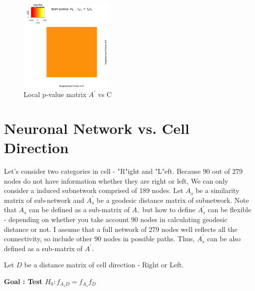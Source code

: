 \documentclass[12pt]{report}
\begin{document}
\begin{figure}[H]
\captionsetup{format=plain}
\centering
\includegraphics[width=0.4\textwidth]{../figure/P_A2_C.png}
\caption{Local p-value matrix $A^\prime$ vs C}
\label{fig:PA2C}
\end{figure} 





\newpage
\section{Neuronal Network vs. Cell Direction}

Let's consider two categories in cell - "R"ight and "L"eft. Because 90 out of 279 nodes do not have information whether they are right or left, We can only consider a induced subnetwork comprised of 189 nodes. Let $A_{s}$ be a similarity matrix of sub-network and $A^\prime_{s}$ be a geodesic distance matrix of subnetwork. Note that $A_{s}$ can be defined as a sub-matrix of $A,$ but how to define $A^\prime_{s}$ can be flexible - depending on whether you take account 90 nodes in calculating geodesic distance or not. I assume that a full network of 279 nodes well reflects all the connectivity, so include other 90 nodes in possible paths. Thus, $A^\prime_{s}$ can be also defined as a sub-matrix of $A^\prime.$
  
Let $D$ be a distance matrix of cell direction - Right or Left. 

\begin{center}\textbf{Goal : Test $H_{0} : f_{A_{s}D} = f_{A_{s}}f_{D}$}
\end{center}  
\end{document}
